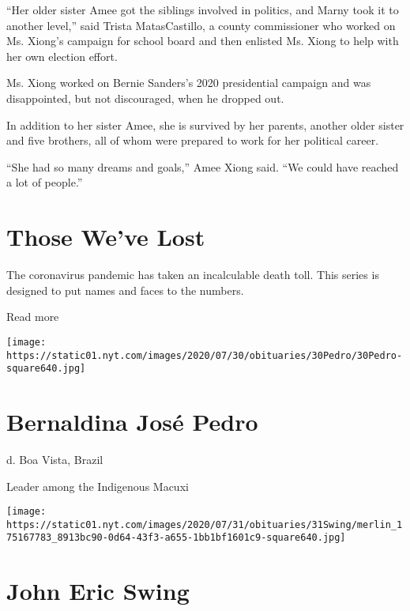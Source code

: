 ``Her older sister Amee got the siblings involved in politics, and Marny
took it to another level,'' said Trista MatasCastillo, a county
commissioner who worked on Ms. Xiong's campaign for school board and
then enlisted Ms. Xiong to help with her own election effort.

Ms. Xiong worked on Bernie Sanders's 2020 presidential campaign and was
disappointed, but not discouraged, when he dropped out.

In addition to her sister Amee, she is survived by her parents, another
older sister and five brothers, all of whom were prepared to work for
her political career.

``She had so many dreams and goals,'' Amee Xiong said. ``We could have
reached a lot of people.''

\href{https://www.nytimes.com/interactive/2020/obituaries/people-died-coronavirus-obituaries.html?action=click\&pgtype=Article\&state=default\&region=BELOW_MAIN_CONTENT\&context=covid_obits_promo}{}

\hypertarget{those-weve-lost}{%
\section{Those We've Lost}\label{those-weve-lost}}

The coronavirus pandemic has taken an incalculable death toll. This
series is designed to put names and faces to the numbers.

Read more

\texttt{[image: https://static01.nyt.com/images/2020/07/30/obituaries/30Pedro/30Pedro-square640.jpg]}

\hypertarget{bernaldina-josuxe9-pedro}{%
\section{Bernaldina José Pedro}\label{bernaldina-josuxe9-pedro}}

d. Boa Vista, Brazil

Leader among the Indigenous Macuxi

\texttt{[image: https://static01.nyt.com/images/2020/07/31/obituaries/31Swing/merlin\_175167783\_8913bc90-0d64-43f3-a655-1bb1bf1601c9-square640.jpg]}

\hypertarget{john-eric-swing}{%
\section{John Eric Swing}\label{john-eric-swing}}

